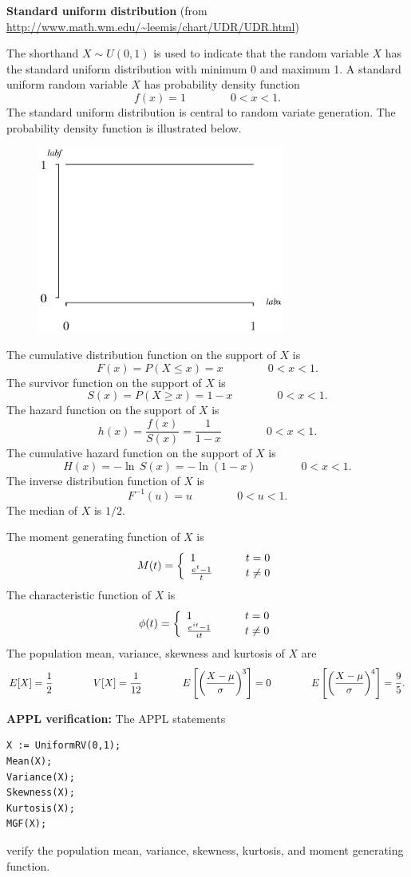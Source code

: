 \documentclass[12pt,fullpage]{article}
\begin{document}
\noindent
{\bf Standard uniform distribution} (from \color{blue}\url{http://www.math.wm.edu/~leemis/chart/UDR/UDR.html}\color{black})

\noindent
The shorthand $X \sim U(0,1)$ is used to indicate that the
random variable $X$ has the standard uniform distribution with minimum 0 and maximum 1.
A standard uniform random variable $X$ has probability density function 
$$
f(x) = 1\qquad \qquad 0 < x < 1.
$$
The standard uniform distribution is central to random variate generation.
The probability density function is illustrated below.
{\begin{figure}[h!]
\begin{center}
\includegraphics[width=3.2in]{StandarduniformPlot.ps}
\end{center}
\end{figure}}

\noindent
The cumulative distribution function on
the support of $X$ is
$$
F(x) = P(X \le x) = x \qquad \qquad 0 < x < 1.
$$
The survivor function on the support of $X$ is
$$
S(x) = P(X \ge x) = 1- x \qquad \qquad 0 < x < 1.
$$
The hazard function on the support of $X$ is
$$
h(x) = \frac{f(x)} {S(x)} =\frac{1}{1 - x} \qquad \qquad 0 < x < 1.
$$
The cumulative hazard function on the support of $X$ is
$$
H(x) = - \ln \,S(x) =  - \ln(1 - x) \qquad \qquad 0 < x < 1.
$$
The inverse distribution function of $X$ is
$$
F ^ {-1}(u) = u \qquad \qquad 0 < u < 1.
$$
The median of $X$ is $1/2$.

\noindent
The moment generating function of $X$ is
$$
M(t) = \left\{ \begin{array}{ll} 
       1 & \qquad t = 0\\ 
      \frac{e^{\kern 0.04em t}-1}{t} & \qquad t \neq 0
       \end{array} \right.
$$
The characteristic function of $X$ is
$$
\phi(t) = \left\{ \begin{array}{ll} 
          1 & \qquad t = 0\\ 
         \frac{e^{\kern 0.04em it}-1}{it} & \qquad t \neq 0
          \end{array} \right.
$$
The population mean, variance, skewness and kurtosis of $X$ are
$$
E[X] = \frac{1}{2} \qquad \qquad 
V[X] = \frac{1}{12} \qquad \qquad
E\left[ \left( \frac{X - \mu}{\sigma} \right) ^ {\kern -0.08 em 3} \right] = 0 \qquad \qquad 
E\left[ \left( \frac{X - \mu}{\sigma} \right) ^ {\kern -0.08 em 4} \right] = \frac{9}{5}.
$$


\vspace{0.1in}

\noindent
{\bf APPL verification:}
The APPL statements
\begin{verbatim}
X := UniformRV(0,1);
Mean(X);
Variance(X);
Skewness(X);
Kurtosis(X);
MGF(X);
\end{verbatim}
verify the population mean, variance, skewness, kurtosis, and moment generating function.
\end{document}
